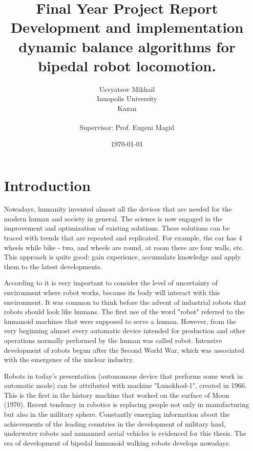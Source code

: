 \documentclass[11pt,a4paper]{report}
\begin{document}
	
\title{Final Year Project Report\\ Development and implementation dynamic balance algorithms for bipedal robot locomotion.}
\author{Usvyatsov Mikhail\\Innopolis University\\Kazan\\  ~\\ \normalsize Supervisor: Prof. Eugeni Magid}
\date{\normalsize \today}
\maketitle

\tableofcontents

\newpage

\chapter{Introduction}
Nowadays, humanity invented almost all the devices that are needed for the modern human and society in general. The science is now engaged in the improvement and optimization of existing solutions. These solutions can be traced with trends that are repeated and replicated. For example, the car has 4 wheels while bike - two, and wheels are round, at room there are four walls, etc. This approach is quite good: gain experience, accumulate knowledge and apply them to the latest developments.

According to \cite{pfeifer2007self} it is very important to consider the level of uncertainty of environment where robot works, because its body will interact with this environment. It was common to think before the advent of industrial robots that robots should look like humans. The first use of the word "robot" referred to the humanoid machines that were supposed to serve a human. However, from the very beginning almost every automatic device intended for production and other operations normally performed by the human was called robot. Intensive development of robots begun after the Second World War, which was associated with the emergence of the nuclear industry.

Robots in today's presentation (autonomous device that performs some work in automatic mode) can be attributed with machine "Lunokhod-1", created in 1966. This is the first in the history machine that worked on the surface of Moon (1970). Recent tendency in robotics is replacing people not only in manufacturing but also in the military sphere. Constantly emerging information about the achievements of the leading countries in the development of military land, underwater robots and unmanned aerial vehicles is evidenced for this thesis. The era of development of  bipedal humanoid walking robots develops nowadays.
\end{document}
